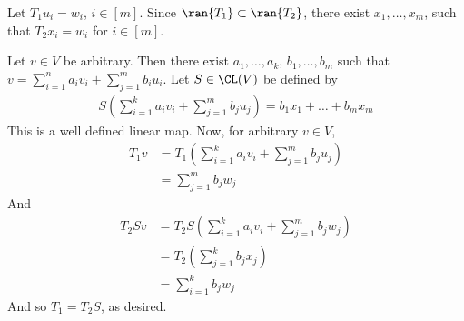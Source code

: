 \documentclass{book}
\begin{document}
\begin{enumerate}[label=\arabic*)]
      Let $T_1u_i = w_i$, $i \in [m]$. Since $\ran{T_1} \subset \ran{T_2}$, there exist $x_1, \dots, x_m$, such that $T_2x_i = w_i$ for $i \in [m]$. 

      Let $v \in V$ be arbitrary. Then there exist $a_1, \dots, a_k$, $b_1, \dots, b_m$ such that $v = \sum_{i = 1}^{n}a_iv_i + \sum_{j = 1}^{m}b_iu_i$.  Let $S \in \CL(V)$ be defined by 
      \begin{align*}
        S(\sum_{i = 1}^{k}a_iv_i + \sum_{j = 1}^{m}b_ju_j) = b_1x_1 + \dots + b_mx_m
      \end{align*}
      This is a well defined linear map. Now, for arbitrary $v \in V$, 
      \begin{align*}
        T_1v & = T_1(\sum_{i = 1}^{k}a_iv_i + \sum_{j = 1}^{m}b_ju_j) \\
        & = \sum_{j = 1}^{m}b_jw_j
      \end{align*}
      And
      \begin{align*}
        T_2Sv & = T_2S(\sum_{i = 1}^{k}a_iv_i + \sum_{j = 1}^{m}b_jw_j) \\
        & = T_2(\sum_{j = 1}^{k}b_jx_j) \\
        & = \sum_{i = 1}^{k}b_jw_j
      \end{align*}
      And so $T_1 = T_2S$, as desired.


\end{enumerate}
\end{document}
